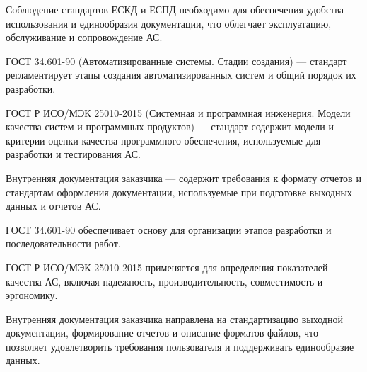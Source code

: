 Соблюдение стандартов ЕСКД и ЕСПД необходимо
для обеспечения удобства использования и единообразия документации,
что облегчает эксплуатацию, обслуживание и сопровождение АС.



ГОСТ 34.601-90 (Автоматизированные системы. Стадии создания)
--- стандарт регламентирует этапы создания автоматизированных систем
и общий порядок их разработки.

ГОСТ Р ИСО/МЭК 25010-2015 (Системная и программная инженерия.
Модели качества систем и программных продуктов) --- стандарт содержит модели
и критерии оценки качества программного обеспечения,
используемые для разработки и тестирования АС.


Внутренняя документация заказчика --- содержит требования к формату отчетов
и стандартам оформления документации,
используемые при подготовке выходных данных и отчетов АС.


ГОСТ 34.601-90 обеспечивает основу для организации этапов разработки
и последовательности работ.

ГОСТ Р ИСО/МЭК 25010-2015 применяется
для определения показателей качества АС, включая надежность,
производительность, совместимость и эргономику.


Внутренняя документация заказчика направлена
на стандартизацию выходной документации,
формирование отчетов и описание форматов файлов,
что позволяет удовлетворить требования пользователя
и поддерживать единообразие данных.




